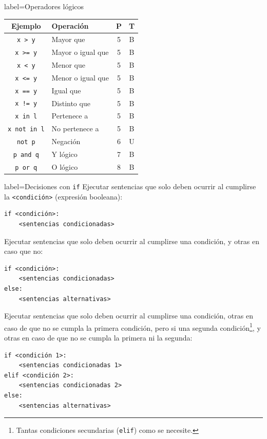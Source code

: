 \documentclass[10pt]{article}
\begin{document}
\begin{multicols*}{3}
\begin{contentbox}{label=Operadores lógicos}
    \begin{center}
        \begin{tabular}{C|l|c|c}
            \textnormal{Ejemplo} & Operación & P & T \\
            \hline
            \lstinline!x > y! & Mayor que & 5 & B \\
            \lstinline!x >= y! & Mayor o igual que & 5 & B \\
            \lstinline!x < y! & Menor que & 5 & B \\
            \lstinline!x <= y! & Menor o igual que & 5 & B \\
            \lstinline!x == y! & Igual que & 5 & B \\
            \lstinline+x != y+ & Distinto que & 5 & B \\
            \lstinline!x in l! & Pertenece a & 5 & B \\
            \lstinline!x not in l! & No pertenece a & 5 & B \\
            \hline
            \lstinline!not p! & Negación & 6 & U \\
            \lstinline!p and q! & Y lógico & 7 & B \\
            \lstinline!p or q! & O lógico & 8 & B \\
            \hline
        \end{tabular}
    \end{center}
\end{contentbox}

\begin{contentbox}{label=Decisiones con \texttt{if}}
    Ejecutar sentencias que solo deben ocurrir al cumplirse la \lstinline!<condición>! (\alert{expresión booleana}):
\begin{lstlisting}
if <condición>:
    <sentencias condicionadas>
\end{lstlisting}

    Ejecutar sentencias que solo deben ocurrir al cumplirse una condición, y otras en caso que no:
\begin{lstlisting}
if <condición>:
    <sentencias condicionadas>
else:
    <sentencias alternativas>
\end{lstlisting}

    Ejecutar sentencias que solo deben ocurrir al cumplirse una condición, otras en caso de que no se cumpla la primera condición, pero si una segunda condición\footnote{Tantas condiciones secundarias (\lstinline!elif!) como se necesite.}, y otras en caso de que no se cumpla la primera ni la segunda:
\begin{lstlisting}
if <condición 1>:
    <sentencias condicionadas 1>
elif <condición 2>:
    <sentencias condicionadas 2>
else:
    <sentencias alternativas>
\end{lstlisting}
\end{contentbox}


\end{multicols*}
\end{document}
